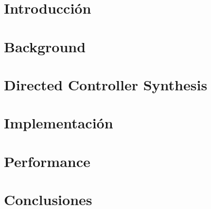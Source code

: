 \documentclass[11pt,a4paper,twoside]{tesis}
\begin{document}

\def\autor{Matias Duran, Florencia Zanollo}
\def\tituloTesis{TESIS\\Directed Controller Synthesis for \\ Non-Maximal Blocking 
	Requirements}
\def\runtitulo{Sintesis de Controladores Dirigida}
\def\runtitle{Directed Controller Synthesis}
\def\director{Sebasit\'an Uchitel}
\def\codirector{???}
\def\lugar{Buenos Aires, 2020}


\frontmatter
\pagestyle{empty}


\cleardoublepage

\cleardoublepage


\cleardoublepage
\tableofcontents

\mainmatter
\pagestyle{headings}




\chapter{Introducción}



\chapter{Background}


\chapter{Directed Controller Synthesis}


\chapter{Implementación}


\chapter{Performance}



\chapter{Conclusiones}


\backmatter

\end{document}
